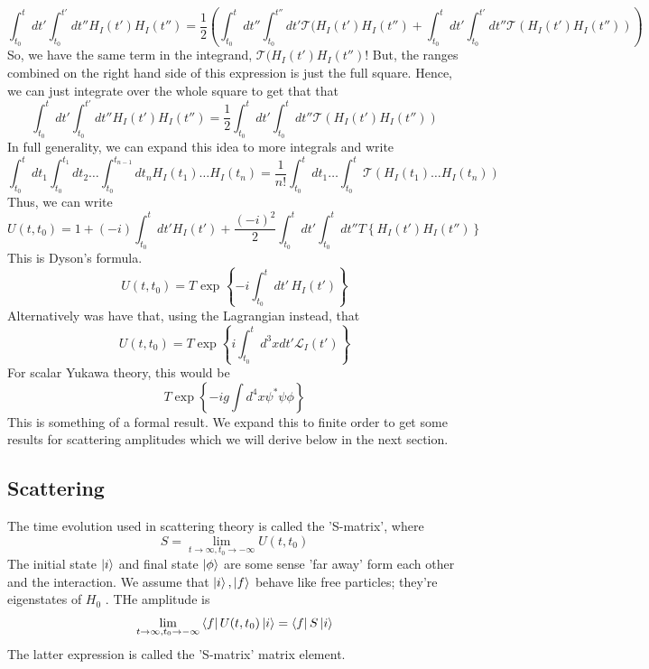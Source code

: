 \documentclass[11pt, oneside]{article}   	%
\theoremstyle{newline}
\theoremstyle{newline}
\theoremstyle{newline}
\theoremstyle{newline}
\theoremstyle{newline}
\begin{document}
\[
\int_{ t_0 } ^ t dt' \int_{ t_0 } ^{ t' } dt'' H_{ I } ( t' ) H_{ I } ( t'' ) =\frac{1}{2 } \left(  \int_{ t_ 0 } ^ t dt'' \int_{ t_0 }^{ t''} dt' \mathcal{ T } ( H_{ I }( t' ) H_{ I } ( t'' )  + \int _{ t_0 } ^ t dt' \int_{ t_0  }^{ t' } dt'' \mathcal{ T } ( H_I ( t' ) H _ I ( t'' ) ) \right)  
\] So, we have the same term in the integrand, $ \mathcal{ T } ( H_ I ( t' ) H _ I ( t'') $!
But, the ranges combined on the right hand side of 
this expression is just the full square. 
Hence, we can just integrate over the whole square to get that that
\[
\int_{ t_0 } ^ t dt' \int_{ t_0 } ^{ t' } dt'' H_{ I } ( t' ) H_{ I } ( t'' ) = \frac{1}{2 } \int_{ t_0 } ^ t dt' \int_{ t_0  }^ t dt'' \mathcal{ T } ( H _I ( t' ) H_ I ( t'' ) )  
\]  In full generality, we can expand this 
idea to more integrals and write 
\[
\int_{ t_0  } ^ t dt_1 \int_{ t_ 0 } ^{ t_1 } dt_2 \dots \int_{ t_0 } ^{ t_{ n - 1  } } dt_{ n } H_I ( t_1) \dots  H_{ I } ( t_{ n } )  = \frac{1}{n ! } \int_{ t_0 } ^ t dt_1 \dots \int_{ t_0 } ^{ t  } \mathcal{ T } \left(  H _ I ( t_1 ) \dots H _ I ( t_{ n } )  \right) 
\]  
Thus, we can write 
\[
U ( t, t_0) = 1 + ( -i ) \int_{ t_0 } ^ t dt' H_I ( t' ) + \frac{ ( -i ) ^ 2 }{2 } \int_{ t_0 }^t dt' \int_{ t_0 }^ t dt'' T \left\{  H_I ( t' ) H_I ( t'' )  \right\}  
\] This is Dyson's formula. 
\[
U ( t, t_0) = T \text{ exp } \left\{  - i \int_{ t_0 } ^ t dt' \, H_I ( t' )  \right\} 
\] Alternatively was have that, using the Lagrangian instead, that 
\[
U ( t, t_0 ) = T \exp \left\{  i \int_{ t_0 } ^ t  d^ 3 x dt ' \mathcal{ L }_ I ( t' )  \right\} 
\] For scalar Yukawa theory,  this would be 
\[
T \exp \left\{   - i g \int d^  4 x \psi ^ * \psi \phi  \right\} 
\] This is something of a formal result. 
We expand this to finite order to get some results for scattering
amplitudes which we will derive below in the next section. 

\subsection{ Scattering } 
The time evolution used in scattering theory is called 
the 'S-matrix', where
\[
S= \lim_{t  \to \infty, t_0 \to  - \infty}U ( t, t_0 )   
\] The initial state $ \ket{i } $ and final state $ \ket{ \phi }  $ 
are some sense 'far away' form each other and the interaction. 
We assume that $ \ket{ i } , \ket{ f  } $ behave like free particles; 
they're eigenstates of $ H_0 $ . 
THe amplitude is 
\[
\lim_{ t  \to \infty, t_0 \to  - \infty } \bra{  f} U ( t, t_0 )\ket { i }  = \bra{ f} S \ket{ i }   
\] The latter expression is called the 'S-matrix' matrix element.
\end{document}
